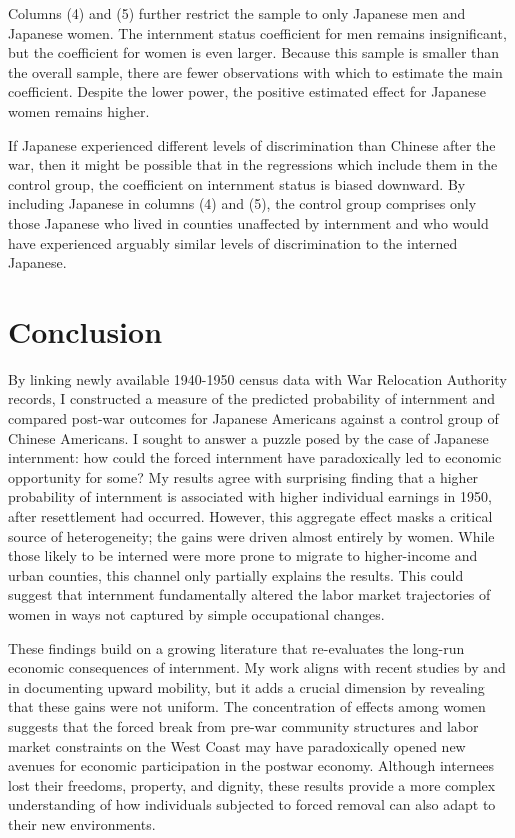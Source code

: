 \documentclass[12pt]{article}
\begin{document}
Columns (4) and (5) further restrict the sample to only Japanese men
and Japanese women.
The internment status coefficient for men remains insignificant,
but the coefficient for women is even larger.
Because this sample is smaller than the overall sample,
there are fewer observations with which to estimate the main coefficient.
Despite the lower power, the positive estimated effect for Japanese women remains higher.

If Japanese experienced different levels of discrimination
than Chinese after the war,
then it might be possible that in the regressions
which include them in the control group,
the coefficient on internment status is biased downward.
By including Japanese in columns (4) and (5),
the control group comprises only those Japanese
who lived in counties unaffected by internment
and who would have experienced arguably similar levels of discrimination
to the interned Japanese.
\section{Conclusion}
\label{sec:org2e561ee}

By linking newly available 1940-1950 census data
with War Relocation Authority records,
I constructed a measure of the predicted probability of internment
and compared post-war outcomes for Japanese Americans
against a control group of Chinese Americans.
I sought to answer a puzzle posed by the case of Japanese internment:
how could the forced internment have paradoxically
led to economic opportunity for some?
My results agree with surprising finding that a higher probability of internment
is associated with higher individual earnings in 1950, after resettlement had occurred.
However, this aggregate effect masks a critical source of heterogeneity;
the gains were driven almost entirely by women.
While those likely to be interned were more prone to migrate to higher-income and urban counties,
this channel only partially explains the results.
This could suggest that internment fundamentally altered the labor market trajectories of women
in ways not captured by simple occupational changes.

These findings build on a growing literature
that re-evaluates the long-run economic consequences of internment.
My work aligns with recent studies
by \citet{arellano-boverDisplacementDiversityMobility2022}
and \citet{shoagCausalEffectPlace2016}
in documenting upward mobility,
but it adds a crucial dimension by revealing that these gains were not uniform.
The concentration of effects among women
suggests that the forced break from pre-war community structures
and labor market constraints on the West Coast
may have paradoxically opened new avenues for economic participation in the postwar economy.
Although internees lost their freedoms, property, and dignity,
these results provide a more complex understanding
of how individuals subjected to forced removal
can also adapt to their new environments.
\end{document}
